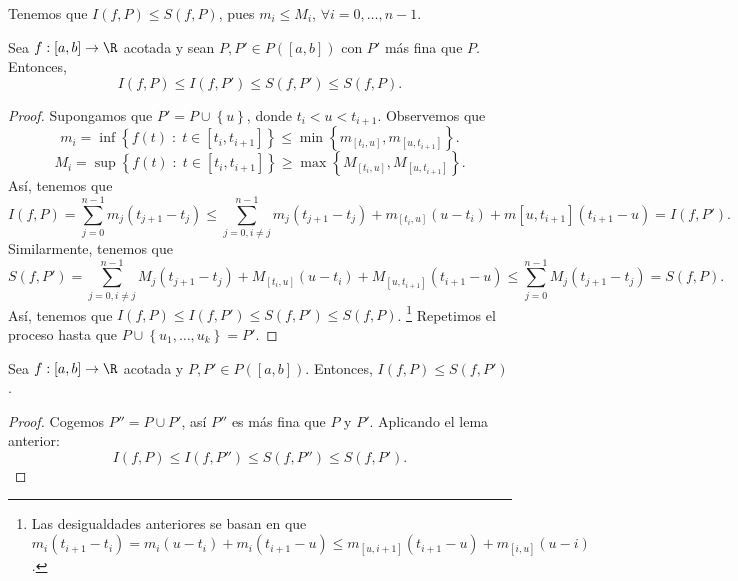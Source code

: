 \begin{observation}
\normalfont Tenemos que $\displaystyle I\left(f,P\right) \leq S\left(f,P\right) $, pues $\displaystyle m_{i} \leq M_{i} $, $\displaystyle \forall i = 0, \ldots, n-1 $.
\end{observation}
\begin{flema}[]
	\normalfont Sea $\displaystyle f : \left[a,b\right] \to \R $ acotada y sean $\displaystyle P,P' \in P\left([a,b]\right) $ con $\displaystyle P' $ más fina que $\displaystyle P $. Entonces, 
	\[ I\left(f,P\right) \leq I\left(f,P'\right) \leq S\left(f,P'\right) \leq S\left(f,P\right) .\]
\end{flema}
\begin{proof}
	Supongamos que $\displaystyle P' = P \cup \left\{ u\right\}  $, donde $\displaystyle t_{i} < u < t_{i+1} $. Observemos que 
	\[ m_{i} = \inf \left\{ f\left(t\right) \; : \; t \in \left[t_{i}, t_{i+1}\right] \right\} \leq \min \left\{ m_{[t_{i}, u]}, m_{[u, t_{i+1}]}\right\} 
	.\]
\[ M_{i} = \sup \left\{ f\left(t\right) \; : \; t \in \left[t_{i}, t_{i+1}\right] \right\} \geq \max \left\{ M_{[t_{i}, u]}, M_{[u, t_{i+1}]}\right\}.\]
Así, tenemos que 
\[ I\left(f, P\right)= \sum^{n-1}_{j = 0}m_{j}\left(t_{j+1}-t_{j}\right) \leq \sum^{n-1}_{j=0, i \neq j} m_{j}\left(t_{j+1}-t_{j}\right) + m_{[t_{i},u]}\left(u-t_{i}\right) + m[u,t_{i+1}]\left(t_{i+1}-u\right) = I\left(f,P'\right).\]
Similarmente, tenemos que 
\[ S\left(f,P'\right) = \sum^{n-1}_{j=0,i\neq j}M_{j}\left(t_{j+1}-t_{j}\right) + M_{[t_{i}, u]}\left(u-t_{i}\right) + M_{[u,t_{i+1}]}\left(t_{i+1}-u\right) \leq \sum^{n-1}_{j=0}M_{j}\left(t_{j+1}-t_{j}\right) = S\left(f,P\right) .\]
Así, tenemos que $\displaystyle I\left(f,P\right) \leq I\left(f,P'\right) \leq S\left(f,P'\right) \leq S\left(f,P\right) $. \footnote{Las desigualdades anteriores se basan en que $\displaystyle m_{i}\left(t_{i+1}-t_{i}\right) = m_{i}\left(u - t_{i}\right) + m_{i}\left(t_{i+1}-u\right) \leq m_{[u,i+1]}\left(t_{i+1}-u\right) + m_{[i,u]}\left(u-i\right) $. } 
Repetimos el proceso hasta que $\displaystyle P \cup \left\{ u_{1}, \ldots, u_{k}\right\} = P' $.
\end{proof}
\begin{flema}[]
	\normalfont Sea $\displaystyle f: [a,b] \to \R$ acotada y $\displaystyle P,P' \in P\left([a,b]\right) $. Entonces, $\displaystyle I\left(f, P\right) \leq S\left(f, P'\right) $.
\end{flema}
\begin{proof}
Cogemos $\displaystyle P'' = P \cup P' $, así $\displaystyle P'' $ es más fina que $\displaystyle P $ y $\displaystyle P' $. Aplicando el lema anterior:
\[ I\left(f,P\right) \leq I\left(f,P''\right) \leq S\left(f,P''\right) \leq S\left(f,P'\right) .\]
\end{proof}
